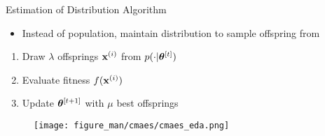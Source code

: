 \documentclass[11pt,compress,t,notes=noshow, xcolor=table]{beamer}
\begin{document}
%
%
%
%
%
%
\begin{frame}{Estimation of Distribution Algorithm}

\begin{minipage}{0.62\textwidth}
\begin{itemize}
    \item Instead of population, maintain distribution to sample offspring from
\end{itemize}

\vspace{\baselineskip}

\begin{enumerate}
    \item Draw $\lambda$ offsprings $\mathbf{x}^{(i)}$ from $p(\cdot|\bm{\theta}^{[t]})$
    \item Evaluate fitness $f(\mathbf{x}^{(i)})$ 
    \item Update $\bm{\theta}^{[t+1]}$ with $\mu$ best offsprings
\end{enumerate}

\end{minipage}\hfill
\begin{minipage}{0.35\textwidth}\raggedleft
\begin{figure}
  \texttt{[image: figure\_man/cmaes/cmaes\_eda.png]}
\end{figure}
\end{minipage}

\end{frame}
\end{document}
